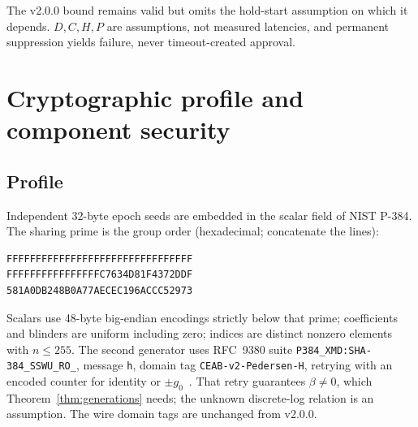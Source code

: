 \documentclass[pdflatex,sn-mathphys-num,twocolumn]{sn-jnl}
\theoremstyle{plain}
\theoremstyle{definition}
\newcommand{\code}[1]{\texttt{#1}}
\begin{document}
The v2.0.0 bound remains valid but omits the hold-start assumption on which it depends. $D,C,H,P$ are assumptions, not measured latencies, and permanent suppression yields failure, never timeout-created approval.


\section{Cryptographic profile and component security}\label{sec:crypto}

\subsection{Profile}\label{sec:profile}
Independent 32-byte epoch seeds are embedded in the scalar field of NIST P-384. The sharing prime is the group order (hexadecimal; concatenate the lines):
\begin{Verbatim}[fontsize=\small]
FFFFFFFFFFFFFFFFFFFFFFFFFFFFFFFF
FFFFFFFFFFFFFFFFC7634D81F4372DDF
581A0DB248B0A77AECEC196ACCC52973
\end{Verbatim}
Scalars use 48-byte big-endian encodings strictly below that prime; coefficients and blinders are uniform including zero; indices are distinct nonzero elements with $n\le255$. The second generator uses RFC~9380 suite \code{P384\_XMD:SHA-384\_SSWU\_RO\_}, message \code{h}, domain tag \code{CEAB-v2-Pedersen-H}, retrying with an encoded counter for identity or $\pm g_0$~\cite{rfc9380,sec2}. That retry guarantees $\beta\ne0$, which Theorem~\ref{thm:generations} needs; the unknown discrete-log relation is an assumption. The wire domain tags are unchanged from v2.0.0.
\end{document}

